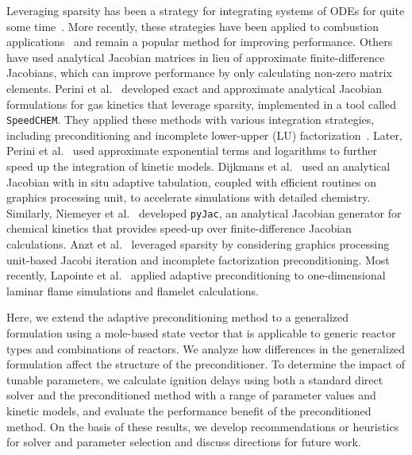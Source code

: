 \documentclass[preprint, 12pt]{elsarticle}
\begin{document}
Leveraging sparsity has been a strategy for integrating systems of ODEs for quite some time~\cite{brown_reduced_1989, saad_ilut_1994}.
More recently, these strategies have been applied to combustion applications~\cite{marzouk_embedding_2012} and remain a popular method for improving performance.
Others have used analytical Jacobian matrices in lieu of approximate finite-difference Jacobians, which can improve performance by only calculating non-zero matrix elements.
Perini et al.~\cite{perini_analytical_2012} developed exact and approximate analytical Jacobian formulations for gas kinetics that leverage sparsity, implemented in a tool called \texttt{SpeedCHEM}.
They applied these methods with various integration strategies, including preconditioning and incomplete lower-upper (LU) factorization~\cite{perini_study_2014}.
Later, Perini et al.~\cite{perini_fast_2018} used approximate exponential terms and logarithms to further speed up the integration of kinetic models.
Dijkmans et al.~\cite{dijkmans_gpu_2014} used an analytical Jacobian with in situ adaptive tabulation, coupled with efficient routines on graphics processing unit, to accelerate simulations with detailed chemistry.
Similarly, Niemeyer et al.~\cite{niemeyer_pyjac_2017} developed \texttt{pyJac}, an analytical Jacobian generator for chemical kinetics that provides speed-up over finite-difference Jacobian calculations.
Anzt et al.~\cite{anzt_preconditioned_2017} leveraged sparsity by considering graphics processing unit-based Jacobi iteration and incomplete factorization preconditioning.
Most recently, Lapointe et al.~\cite{lapointe_sparse_2019, lapointe_computationally-efficient_2020} applied adaptive preconditioning to one-dimensional laminar flame simulations and flamelet calculations.

Here, we extend the adaptive preconditioning method to a generalized formulation using a mole-based state vector that is applicable to generic reactor types and combinations of reactors.
We analyze how differences in the generalized formulation affect the structure of the preconditioner.
To determine the impact of tunable parameters, we calculate ignition delays using both a standard direct solver and the preconditioned method with a range of parameter values and kinetic models, and evaluate the performance benefit of the preconditioned method.
On the basis of these results, we develop recommendations or heuristics for solver and parameter selection and discuss directions for future work.
\end{document}
